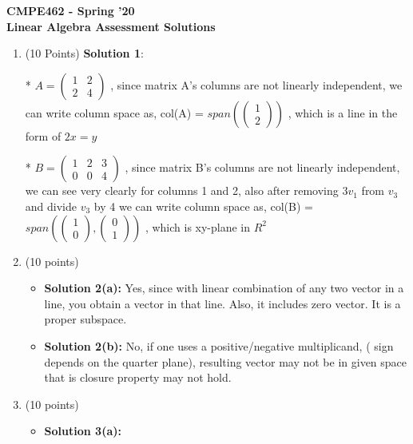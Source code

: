 \documentclass[11pt]{article}
\begin{document}
\begin{center}
\Large{\textbf{CMPE462 - Spring '20\\Linear Algebra Assessment Solutions}}
\end{center}

\begin{enumerate}

\item (10 Points) \textbf{Solution 1}: 


* $A = \begin{pmatrix} 1 & 2 \\ 2 & 4 \end{pmatrix} $  , since matrix A's columns are not linearly independent, we can write column space as, col(A) = $span(\begin{pmatrix} 1 \\ 2 \end{pmatrix})$ , which is a line in the form of $2x = y$

* $B = \begin{pmatrix} 1 & 2 & 3\\ 0 & 0 & 4 \end{pmatrix} $  , since matrix B's columns are not linearly independent, we can see very clearly for columns 1 and 2, also after removing $3v_1$ from $v_3$ and divide $v_3$ by 4 we can write column space as, col(B) = $span(\begin{pmatrix} 1 \\ 0 \end{pmatrix}, \begin{pmatrix} 0 \\ 1 \end{pmatrix})$ , which is xy-plane in $R^2$

\item (10 points)
\begin{itemize}
    \item \textbf{Solution 2(a):} Yes, since with linear combination of any two vector in a line, you obtain a vector in that line. Also, it includes zero vector. It is a proper subspace.
    \item \textbf{Solution 2(b):} No, if one uses a positive/negative multiplicand, ( sign depends on the quarter plane), resulting vector may not be in given space that is closure property may not hold.
\end{itemize}


\item (10 points) 
\begin{itemize}
    \item \textbf{Solution 3(a):}
    

\end{itemize}
\end{enumerate}
\end{document}
